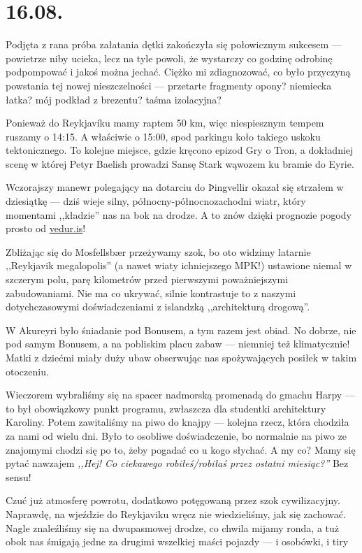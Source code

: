 \chapter*{16.08.}

Podjęta z rana próba załatania dętki zakończyła się połowicznym sukcesem --- powietrze niby ucieka, lecz na tyle powoli, że wystarczy co godzinę odrobinę podpompować i jakoś można jechać. Ciężko mi zdiagnozować, co było przyczyną powstania tej nowej nieszczelności --- przetarte fragmenty opony? niemiecka łatka? mój podkład z brezentu? taśma izolacyjna?

Ponieważ do Reykjavíku mamy raptem 50 km, więc niespiesznym tempem ruszamy o 14:15. A właściwie o 15:00, spod parkingu koło takiego uskoku tektonicznego. To kolejne miejsce, gdzie kręcono epizod Gry o Tron, a dokładniej scenę w której Petyr Baelish prowadzi Sansę Stark wąwozem ku bramie do Eyrie.

Wczorajszy manewr polegający na dotarciu do Þingvellir okazał się strzałem w dziesiątkę --- dziś wieje silny, północny-północnozachodni wiatr, który momentami ,,kładzie'' nas na bok na drodze. A to znów dzięki prognozie pogody prosto od \url{vedur.is}!

Zbliżając się do Mosfellsbær przeżywamy szok, bo oto widzimy latarnie ,,Reykjavik megalopolis'' (a nawet wiaty ichniejszego MPK!) ustawione niemal w szczerym polu, parę kilometrów przed pierwszymi poważniejszymi zabudowaniami. Nie ma co ukrywać, silnie kontrastuje to z naszymi dotychczasowymi doświadczeniami z islandzką ,,architekturą drogową''.


W Akureyri było śniadanie pod Bonusem, a tym razem jest obiad. No dobrze, nie pod samym Bonusem, a na pobliskim placu zabaw --- niemniej też klimatycznie! Matki z dziećmi miały duży ubaw obserwując nas spożywających posiłek w takim otoczeniu.

Wieczorem wybraliśmy się na spacer nadmorską promenadą do gmachu Harpy --- to był obowiązkowy punkt programu, zwłaszcza dla studentki architektury Karoliny. Potem zawitaliśmy na piwo do knajpy --- kolejna rzecz, która chodziła za nami od wielu dni. Było to osobliwe doświadczenie, bo normalnie na piwo ze znajomymi chodzi się po to, żeby pogadać co u kogo słychać. A my co? Mamy się pytać nawzajem \emph{,,Hej! Co ciekawego robiłeś/robiłaś przez ostatni miesiąc?''} Bez sensu!

Czuć już atmosferę powrotu, dodatkowo potęgowaną przez szok cywilizacyjny. Naprawdę, na wjeździe  do Reykjaviku wręcz nie wiedzieliśmy, jak się zachować. Nagle znaleźliśmy się na dwupasmowej drodze, co chwila mijamy ronda, a tuż obok nas śmigają jedne za drugimi wszelkiej maści pojazdy --- i osobówki, i tiry\textellipsis

